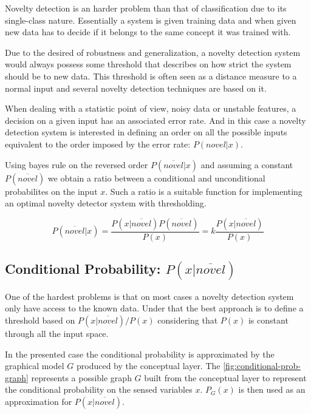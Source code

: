 \documentclass[runningheads,a4paper]{llncs}
\begin{document}
Novelty detection is an harder problem than that of classification due to its single-class nature.
Essentially a system is given training data and when given new data has to decide if it belongs
to the same concept it was trained with.

Due to the desired of robustness and generalization, a novelty detection system would always possess
some threshold that describes on how strict the system should be to new data.
This threshold is often seen as a distance measure to a normal input and several novelty detection
techniques are based on it.

When dealing with a statistic point of view, noisy data or unstable features, a decision on a given input has
an associated error rate. And in this case a novelty detection system is interested in defining an order
on all the possible inputs equivalent to the order imposed by the error rate: $P(novel|x)$.

Using bayes rule on the reversed order $P(\overline{novel}|x)$ and assuming a constant $P(\overline{novel})$
we obtain a ratio between a conditional and unconditional probabilites on the input $x$.
Such a ratio is a suitable function for implementing an optimal novelty detector system with
thresholding.

\begin{equation}
\label{eq:novelty-threshold}
P(\overline{novel}|x) = \frac{P(x|\overline{novel}) P(\overline{novel})}{P(x)} = k\frac{P(x|\overline{novel})}{P(x)}
\end{equation}

\subsection{Conditional Probability: $P(x|\overline{novel})$}
\label{sec:uniform-unconditional}

One of the hardest problems is that on most cases a novelty detection system only have access to 
the known data.
Under that the best approach is to define a threshold based on $P(x|\overline{novel})/P(x)$
considering that $P(x)$ is constant through all the input space.

In the presented case the conditional probability is approximated by the graphical model $G$
produced by the conceptual layer.
The \autoref{fig:conditional-prob-graph} represents a possible graph $G$ built from the conceptual
layer to represent the conditional probability on the sensed variables $x$.
$P_G(x)$ is then used as an approximation for $P(x|\overline{novel})$.
\end{document}

